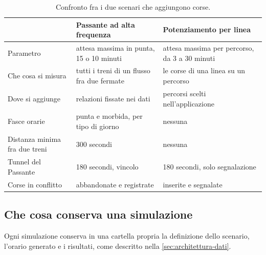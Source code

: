 \begin{table}[H]
	\centering
	\caption{Confronto fra i due scenari che aggiungono corse.}
	\label{tab:scenari-confronto}
	\begin{tabularx}{\textwidth}{lXX}
		\toprule
		 & Passante ad alta frequenza & Potenziamento per linea \\
		\midrule
		Parametro & attesa massima in punta, 15 o 10 minuti & attesa massima per percorso, da 3 a 30 minuti \\
		Che cosa si misura & tutti i treni di un flusso fra due fermate & le corse di una linea su un percorso \\
		Dove si aggiunge & relazioni fissate nei dati & percorsi scelti nell'applicazione \\
		Fasce orarie & punta e morbida, per tipo di giorno & nessuna \\
		Distanza minima fra due treni & 300 secondi & nessuna \\
		Tunnel del Passante & 180 secondi, vincolo & 180 secondi, solo segnalazione \\
		Corse in conflitto & abbandonate e registrate & inserite e segnalate \\
		\bottomrule
	\end{tabularx}
\end{table}

\subsection{Che cosa conserva una simulazione}
Ogni simulazione conserva in una cartella propria la definizione dello scenario, l'orario generato e i risultati, come descritto nella \cref{sec:architettura-dati}.
